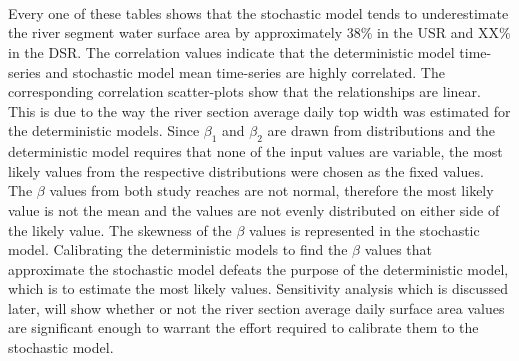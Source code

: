 \begin{linenumbers}
\subtablemid
\begin{table}[htbp]
	\centering
	\caption{USR river segment surface area deterministic and stochastic model numerical results.}
	\begin{subtable}{\textwidth}
		\centering
		
	\end{subtable}\\
\end{table}

\subtabletop
\begin{table}[htbp]
	\centering
	\caption[DSR river segment surface area deterministic and stochastic model numerical results.]{DSR river segment surface area deterministic and stochastic model numerical results.  Values are in hectares (\si{\hectare}) with values in parentheses in acres (\si{\acre}).}
	\label{tab:SegmentSurfaceArea_DSR}
	\begin{subtable}{\textwidth}
		\centering
%		
	\end{subtable}\\
	\tablevspace
	\begin{subtable}{\textwidth}
		\centering
%		
	\end{subtable}\\
\end{table}

Every one of these tables shows that the stochastic model tends to underestimate the river segment water surface area by approximately 38\% in the USR and XX\% in the DSR.  The correlation values indicate that the deterministic model time-series and stochastic model mean time-series are highly correlated.  The corresponding correlation scatter-plots show that the relationships are linear.  This is due to the way the river section average daily top width was estimated for the deterministic models.  Since $ \beta_1 $ and $ \beta_2 $ are drawn from distributions and the deterministic model requires that none of the input values are variable, the most likely values from the respective distributions were chosen as the fixed values.  The $ \beta $ values from both study reaches are not normal, therefore the most likely value is not the mean and the values are not evenly distributed on either side of the likely value.  The skewness of the $ \beta $ values is represented in the stochastic model.  Calibrating the deterministic models to find the $ \beta $ values that approximate the stochastic model defeats the purpose of the deterministic model, which is to estimate the most likely values.  Sensitivity analysis which is discussed later, will show whether or not the river section average daily surface area values are significant enough to warrant the effort required to calibrate them to the stochastic model.


\end{linenumbers}
